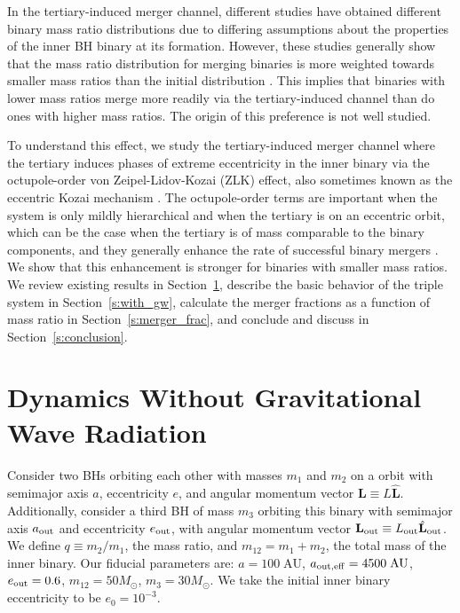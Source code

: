 \documentclass[
        fleqn,
        usenatbib,
    ]{mnras}
\newcommand*{\bm}[1]{\mathbf{#1}}
\newcommand*{\uv}[1]{\hat{\mathbf{#1}}}
\begin{document}
In the tertiary-induced merger channel, different studies have obtained
different binary mass ratio distributions due to differing assumptions about the
properties of the inner BH binary at its formation. However, these studies
generally show that the mass ratio distribution for merging binaries is more
weighted towards smaller mass ratios than the initial distribution
\citep{silsbee2017lidov, fragione2019}. This implies that binaries with lower
mass ratios merge more readily via the tertiary-induced channel than do ones
with higher mass ratios. The origin of this preference is not well studied.

To understand this effect, we study the tertiary-induced merger channel where
the tertiary induces phases of extreme eccentricity in the inner binary via the
octupole-order von Zeipel-Lidov-Kozai (ZLK) effect, also sometimes known as the
eccentric Kozai mechanism \citep[e.g.][]{lithwick2011eccentric}. The
octupole-order terms are important when the system is only mildly hierarchical
and when the tertiary is on an eccentric orbit, which can be the case when the
tertiary is of mass comparable to the binary components, and they generally
enhance the rate of successful binary mergers \citep{ll18}. We show that this
enhancement is stronger for binaries with smaller mass ratios. We review
existing results in Section~\ref{s:background}, describe the basic behavior of
the triple system in Section~\ref{s:with_gw}, calculate the merger fractions as
a function of mass ratio in Section~\ref{s:merger_frac}, and conclude and
discuss in Section~\ref{s:conclusion}.

\section{Dynamics Without Gravitational Wave Radiation}\label{s:background}

Consider two BHs orbiting each other with masses $m_1$ and $m_2$ on a orbit with
semimajor axis $a$, eccentricity $e$, and angular momentum vector $\bm{L} \equiv
L\uv{L}$. Additionally, consider a third BH of mass $m_3$ orbiting this binary
with semimajor axis $a_{\rm out}$ and eccentricity $e_{\rm out}$, with angular
momentum vector $\bm{L}_{\rm out} \equiv L_{\rm out} \uv{L}_{\rm out}$. We
define $q \equiv m_2 / m_1$, the mass ratio, and $m_{12} = m_1 + m_2$, the total
mass of the inner binary. Our fiducial parameters are: $a = 100\;\mathrm{AU}$,
$a_{\rm out, eff} = 4500\;\mathrm{AU}$, $e_{\rm out} = 0.6$, $m_{12} =
50M_{\odot}$, $m_3 = 30M_{\odot}$. We take the initial inner binary eccentricity
to be $e_0 = 10^{-3}$.
\end{document}
